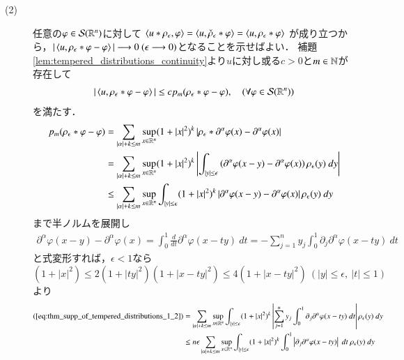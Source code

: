 \begin{prf}
\begin{description}
			\item[(2)]
				任意の$\varphi \in \mathcal{S}(\mathbb{R}^n)$に対して
				$\inprod<u \ast \rho_\epsilon, \varphi> = \inprod<u, \check{\rho}_\epsilon \ast \varphi> = \inprod<u, \rho_\epsilon \ast \varphi>$
				が成り立つから，$|\inprod<u, \rho_\epsilon \ast \varphi - \varphi>| \longrightarrow 0\ (\epsilon \longrightarrow 0)$となることを示せばよい．
				補題\ref{lem:tempered_distributions_continuity}より$u$に対し或る$c > 0$と$m \in \mathbb{N}$が存在して
				\begin{align}
					|\inprod<u, \rho_\epsilon \ast \varphi - \varphi>| \leq c p_m(\rho_\epsilon \ast \varphi - \varphi),
					\quad (\forall \varphi \in \rapid{\R^n})
				\end{align}
				を満たす．
				\begin{align}
					p_m(\rho_\epsilon \ast \varphi - \varphi)
					&= \sum_{|\alpha| + k \leq m} \operatorname*{sup}_{x \in \mathbb{R}^n} (1+|x|^2)^k \left| \rho_\epsilon \ast \partial^\alpha \varphi(x) - \partial^\alpha \varphi(x) \right| \\
					&= \sum_{|\alpha| + k \leq m} 
						\operatorname*{sup}_{x \in \mathbb{R}^n} (1+|x|^2)^k \left| \int_{|y| \leq \epsilon} \left( \partial^\alpha \varphi(x-y) - \partial^\alpha \varphi(x) \right) \rho_\epsilon(y)\ dy \right| \\
					&\leq \sum_{|\alpha| + k \leq m} 
						\operatorname*{sup}_{x \in \mathbb{R}^n} \int_{|y| \leq \epsilon} (1+|x|^2)^k \left| \partial^\alpha \varphi(x-y) - \partial^\alpha \varphi(x) \right| \rho_\epsilon(y)\ dy
					\label{eq:thm_supp_of_tempered_distributions_1_2}
				\end{align}
				まで半ノルムを展開し
				\begin{align}
					\partial^\alpha \varphi(x-y) - \partial^\alpha \varphi(x)
					= \int_0^1 \frac{d}{dt} \partial^\alpha \varphi(x-ty)\ dt
					= -\sum_{j=1}^{n} y_j \int_0^1 \partial_j \partial^\alpha \varphi(x-ty)\ dt
				\end{align}
				と式変形すれば，$\epsilon < 1$なら$(1+|x|^2) \leq 2 (1+|ty|^2)(1+|x-ty|^2) \leq 4(1+|x-ty|^2)\ (|y|\leq \epsilon,\ |t| \leq 1)$より
				\begin{align}
					(\refeq{eq:thm_supp_of_tempered_distributions_1_2})
					&= \sum_{|\alpha| + k \leq m} 
						\sup{x \in \R^n}{\int_{|y| \leq \epsilon} (1+|x|^2)^k  \left| \sum_{j=1}^{n} y_j \int_0^1 \partial_j \partial^\alpha \varphi(x-ty)\ dt \right| \rho_\epsilon(y)\ dy} \\
					&\leq n \epsilon \sum_{|\alpha| + k \leq m} 
						\sup{x \in \R^n}{\int_{|y| \leq \epsilon} (1+|x|^2)^k \int_0^1 \left| \partial_j \partial^\alpha \varphi(x-ty) \right|\ dt\ \rho_\epsilon(y)\ dy} \\

\end{align}
\end{description}
\end{prf}
